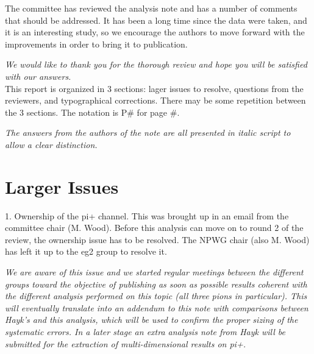 \documentclass[12pt]{article}
\begin{document}
\pagestyle{plain}
\setcounter{page}{2}

The committee has reviewed the analysis note and has a number of comments that should be 
addressed.  It has been a long time since the data were taken, and it is an interesting study, so 
we encourage the authors to move forward with the improvements in order to bring it to 
publication.

{\it We would like to thank you for the thorough review and hope you will be satisfied with
our answers.} \\

This report is organized in 3 sections: lager issues to resolve, questions from the reviewers, and 
typographical corrections.  There may be some repetition between the 3 sections.  The notation 
is P\# for page \#.

{\it The answers from the authors of the note are all presented in italic script 
to allow a clear distinction.} \\

\section{Larger Issues }
1.
Ownership of the pi+ channel.  This was brought up in an email from the committee chair 
(M. Wood).  Before this analysis can move on to round 2 of the review, the ownership issue 
has to be resolved.  The NPWG chair (also M. Wood) has left it up to the eg2 group to 
resolve it.

{\it We are aware of this issue and we started regular meetings between the different 
groups toward the objective of publishing as soon as possible results coherent with
the different analysis performed on this topic (all three pions in particular). This
will eventually translate into an addendum to this note with comparisons between Hayk's 
and this analysis, which will be used to confirm the proper sizing of the systematic errors. 
In a later stage an extra analysis note from Hayk will be submitted
for the extraction of multi-dimensional results on pi+.} \\
\end{document}
